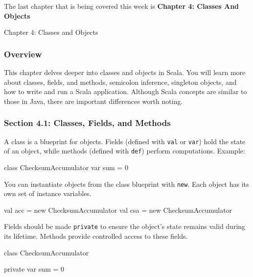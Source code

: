 The last chapter that is being covered this week is \textbf{Chapter 4: Classes And Objects}

\begin{notes}{Chapter 4: Classes and Objects}
    \subsubsection*{Overview}

    This chapter delves deeper into classes and objects in Scala. You will learn more about classes, fields, and methods, semicolon inference, singleton objects, and how to write and run a Scala application. Although Scala concepts are similar to those in Java, there are important differences worth noting. \vspace*{1em}

    \subsubsection*{Section 4.1: Classes, Fields, and Methods}

    A class is a blueprint for objects. Fields (defined with \texttt{val} or \texttt{var}) hold the state of an object, while methods (defined with \texttt{def}) perform computations. Example:

    \begin{highlight}
    \begin{code}[Scala]
    class ChecksumAccumulator {
        var sum = 0
    }
    \end{code}
    \end{highlight}

    You can instantiate objects from the class blueprint with \texttt{new}. Each object has its own set of instance variables.

    \begin{highlight}
    \begin{code}[Scala]
    val acc = new ChecksumAccumulator
    val csa = new ChecksumAccumulator
    \end{code}
    \end{highlight}

    Fields should be made \texttt{private} to ensure the object's state remains valid during its lifetime. Methods provide controlled access to these fields.

    \begin{highlight}[Encapsulation]
    \begin{code}[Scala]
    class ChecksumAccumulator {
        private var sum = 0

}
\end{code}
\end{highlight}
\end{notes}
